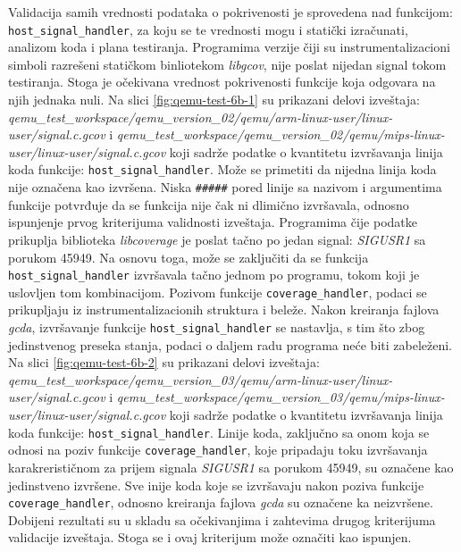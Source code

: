 \documentclass[12pt,oneside]{memoir}
\newcommand{\kod}[1]{\texttt{#1}}
\newcommand{\strano}[1]{\textit{#1}}
\begin{document}
Validacija samih vrednosti podataka o pokrivenosti je sprovedena nad funkcijom: \kod{host\_signal\_handler}, za koju se te vrednosti mogu i statički izračunati, analizom koda i plana testiranja. Programima verzije čiji su instrumentalizacioni simboli razrešeni statičkom binliotekom \strano{libgcov}, nije poslat nijedan signal tokom testiranja. Stoga je očekivana vrednost pokrivenosti funkcije koja odgovara na njih jednaka nuli. Na slici \ref{fig:qemu-test-6b-1} su prikazani delovi izveštaja: \strano{qemu\_test\_workspace/qemu\_version\_02/qemu/arm-linux-user/linux-user/signal.c.gcov} i \strano{qemu\_test\_workspace/qemu\_version\_02/qemu/mips-linux-user/linux-user/signal.c.gcov}
koji sadrže podatke o kvantitetu izvršavanja linija koda funkcije: \kod{host\_signal\_handler}.
Može se primetiti da nijedna linija koda nije označena kao izvršena. Niska \kod{\#\#\#\#\#} pored linije sa nazivom i argumentima funkcije potvrđuje da se funkcija nije čak ni dlimično izvršavala, odnosno ispunjenje prvog kriterijuma validnosti izveštaja. Programima čije podatke prikuplja biblioteka \strano{libcoverage} je poslat tačno po jedan signal: \strano{SIGUSR1} sa porukom 45949. Na osnovu toga, može se zaključiti da se funkcija \kod{host\_signal\_handler} izvršavala tačno jednom po programu, tokom koji je uslovljen tom kombinacijom. Pozivom funkcije \kod{coverage\_handler}, podaci se prikupljaju iz instrumentalizacionih struktura i beleže. Nakon kreiranja fajlova \strano{gcda}, izvršavanje funkcije \kod{host\_signal\_handler} se nastavlja, s tim što zbog jedinstvenog preseka stanja, podaci o daljem radu programa neće biti zabeleženi. Na slici \ref{fig:qemu-test-6b-2} su prikazani delovi izveštaja:
\strano{qemu\_test\_workspace/qemu\_version\_03/qemu/arm-linux-user/linux-user/signal.c.gcov} i \strano{qemu\_test\_workspace/qemu\_version\_03/qemu/mips-linux-user/linux-user/signal.c.gcov}
koji sadrže podatke o kvantitetu izvršavanja linija koda funkcije: \kod{host\_signal\_handler}. Linije koda, zaključno sa onom koja se odnosi na poziv funkcije \kod{coverage\_handler}, koje pripadaju toku izvršavanja karakrerističnom za prijem signala \strano{SIGUSR1} sa porukom  45949, su označene kao jedinstveno izvršene. Sve inije koda koje se izvršavaju nakon poziva funkcije \kod{coverage\_handler}, odnosno kreiranja fajlova \strano{gcda} su označene ka neizvršene. Dobijeni rezultati su u skladu sa očekivanjima i zahtevima drugog kriterijuma validacije izveštaja. Stoga se i ovaj kriterijum može označiti kao ispunjen. 
\end{document}
